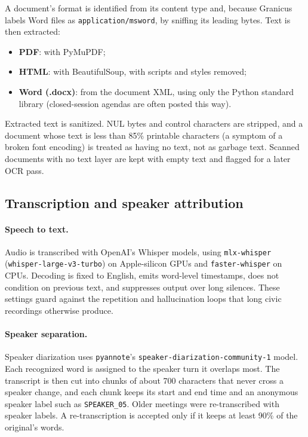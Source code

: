\documentclass[11pt]{article}
\newcommand{\code}[1]{\texttt{#1}}
\begin{document}
A document's format is identified from its content type and, because Granicus labels
Word files as \code{application/msword}, by sniffing its leading bytes. Text is then
extracted:
\begin{itemize}
  \item \textbf{PDF}: with PyMuPDF;
  \item \textbf{HTML}: with BeautifulSoup, with scripts and styles removed;
  \item \textbf{Word (.docx)}: from the document XML, using only the Python standard
        library (closed-session agendas are often posted this way).
\end{itemize}
Extracted text is sanitized. NUL bytes and control characters are stripped, and a
document whose text is less than 85\% printable characters (a symptom of a broken font
encoding) is treated as having no text, not as garbage text. Scanned documents with no
text layer are kept with empty text and flagged for a later OCR pass.

\subsection{Transcription and speaker attribution}
\label{sec:transcription}

\paragraph{Speech to text.} Audio is transcribed with OpenAI's Whisper models, using
\code{mlx-whisper} (\code{whisper-large-v3-turbo}) on Apple-silicon GPUs and
\code{faster-whisper} on CPUs. Decoding is fixed to English, emits word-level timestamps,
does not condition on previous text, and suppresses output over long silences. These
settings guard against the repetition and hallucination loops that long civic recordings
otherwise produce.

{\sloppy\paragraph{Speaker separation.} Speaker diarization uses \code{pyannote}'s
\code{speaker-\allowbreak diarization-\allowbreak community-1} model. Each recognized word is assigned to the
speaker turn it overlaps most. The transcript is then cut into chunks of about 700
characters that never cross a speaker change, and each chunk keeps its start and end
time and an anonymous speaker label such as
\code{SPEAKER\_05}. Older meetings were
re-transcribed with speaker labels. A re-transcription is accepted only if it keeps at
least 90\% of the original's words.\par}
\end{document}
